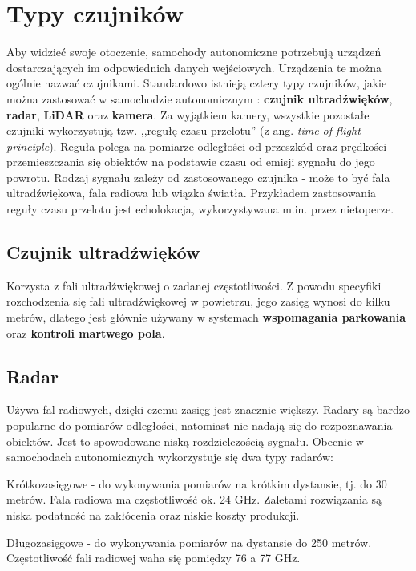 \section{Typy czujników}
Aby widzieć swoje otoczenie, samochody autonomiczne potrzebują urządzeń dostarczających im odpowiednich danych wejściowych. Urządzenia te można ogólnie nazwać czujnikami. Standardowo istnieją cztery typy czujników, jakie można zastosować w samochodzie autonomicznym \cite{petit:sensorFusion}: \textbf{czujnik ultradźwięków}, \textbf{radar}, \textbf{LiDAR} oraz \textbf{kamera}.
Za wyjątkiem kamery, wszystkie pozostałe czujniki wykorzystują tzw. ,,regułę czasu przelotu'' (z ang. \textit{time-of-flight principle}).
Reguła polega na pomiarze odległości od przeszkód oraz prędkości przemieszczania się obiektów na podstawie czasu od emisji sygnału do jego powrotu. Rodzaj sygnału zależy od zastosowanego czujnika - może to być fala ultradźwiękowa, fala radiowa lub wiązka światła. Przykładem zastosowania reguły czasu przelotu jest echolokacja, wykorzystywana m.in. przez nietoperze.

\subsection{Czujnik ultradźwięków}
Korzysta z fali ultradźwiękowej o zadanej częstotliwości. Z powodu specyfiki rozchodzenia się fali ultradźwiękowej w powietrzu, jego zasięg wynosi do kilku metrów, dlatego jest głównie używany w systemach \textbf{wspomagania parkowania} oraz \textbf{kontroli martwego pola}.

\subsection{Radar}
Używa fal radiowych, dzięki czemu zasięg jest znacznie większy. Radary są bardzo popularne do pomiarów odległości, natomiast nie nadają się do rozpoznawania obiektów. Jest to spowodowane niską rozdzielczością sygnału. Obecnie w samochodach autonomicznych wykorzystuje się dwa typy radarów:
\begin{enumerate*}
\vspace{-0.5cm}
\item Krótkozasięgowe - do wykonywania pomiarów na krótkim dystansie, tj. do 30 metrów. Fala radiowa ma częstotliwość ok. 24 GHz. Zaletami rozwiązania są niska podatność na zakłócenia oraz niskie koszty produkcji.
\item Długozasięgowe - do wykonywania pomiarów na dystansie do 250 metrów. Częstotliwość fali radiowej waha się pomiędzy 76 a 77 GHz. 
\end{enumerate*}

